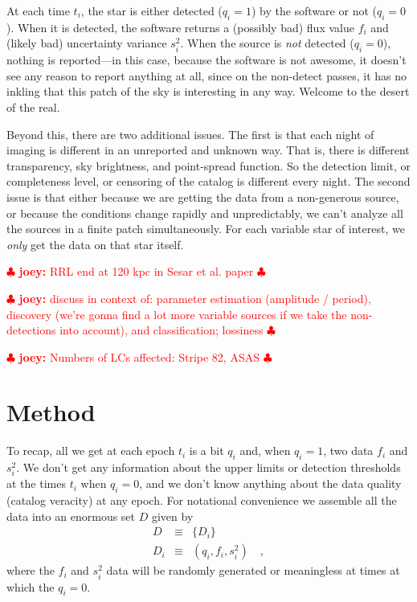 \documentclass[12pt,preprint]{aastex}
\newcommand{\joey}[1] { \textcolor{red} {
\ensuremath{\clubsuit} {\bf joey:}  {#1}
\ensuremath{\clubsuit} } }%
\begin{document}
At each time $t_i$, the star is either detected ($q_i=1$) by the
software or not ($q_i=0$).  When it is detected, the software returns
a (possibly bad) flux value $f_i$ and (likely bad) uncertainty
variance $s_i^2$.  When the source is \emph{not} detected ($q_i=0$),
nothing is reported---in this case, because the software is not
awesome, it doesn't see any reason to report anything at all, since on
the non-detect passes, it has no inkling that this patch of the sky is
interesting in any way.  Welcome to the desert of the real.

Beyond this, there are two additional issues.  The first is that each
night of imaging is different in an unreported and unknown way.  That
is, there is different transparency, sky brightness, and point-spread
function.  So the detection limit, or completeness level, or censoring
of the catalog is different every night.  The second issue is that
either because we are getting the data from a non-generous source, or
because the conditions change rapidly and unpredictably, we can't
analyze all the sources in a finite patch simultaneously.  For each
variable star of interest, we \emph{only} get the data on that star
itself.

\joey{RRL end at 120 kpc in Sesar et al. paper}

\joey{discuss in context of: parameter estimation (amplitude / period), discovery (we're gonna find a lot more variable sources if we take the non-detections into account), and classification; lossiness}

\joey{Numbers of LCs affected: Stripe 82, ASAS}




\section{Method}
\label{sec:method}


To recap, all we get at each epoch $t_i$ is a bit $q_i$ and, when
$q_i=1$, two data $f_i$ and $s_i^2$.  We don't get any information
about the upper limits or detection thresholds at the times $t_i$ when
$q_i=0$, and we don't know anything about the data quality (catalog
veracity) at any epoch.  For notational convenience we assemble all
the data into an enormous set $D$ given by
\begin{eqnarray}\displaystyle
D &\equiv& \{D_i\}
\\
D_i &\equiv& (q_i, f_i, s_i^2)
\quad ,
\end{eqnarray}
where the $f_i$ and $s_i^2$ data will be randomly generated or
meaningless at times at which the $q_i=0$.
\end{document}
